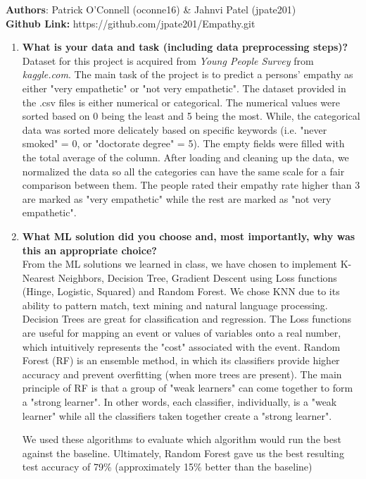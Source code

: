 \documentclass[5px]{report}
\begin{document}
\setlength\parindent{0pt}\textbf{Authors}: Patrick O'Connell (oconne16) \& Jahnvi Patel (jpate201) \\
\textbf{Github Link:} https://github.com/jpate201/Empathy.git
\begin{enumerate}
\item \textbf{What is your data and task (including data preprocessing steps)?} \\
Dataset for this project is acquired from \textit{Young People Survey} from \textit{kaggle.com}. The main task of the project is to predict a persons' empathy as either "very empathetic" or "not very empathetic". The dataset provided in the .csv files is either numerical or categorical. The numerical values were sorted based on 0 being the least and 5 being the most. While, the categorical data was sorted more delicately based on specific keywords (i.e. "never smoked" = 0, or "doctorate degree" = 5). The empty fields were filled with the total average of the column. After loading and cleaning up the data, we normalized the data so all the categories can have the same scale for a fair comparison between them. The people rated their empathy rate higher than 3 are marked as "very empathetic" while the rest are marked as "not very empathetic".

\item \textbf{What ML solution did you choose and, most importantly, why was this an appropriate choice?}\\
From the ML solutions we learned in class, we have chosen to implement K-Nearest Neighbors, Decision Tree, Gradient Descent using Loss functions (Hinge, Logistic, Squared) and Random Forest. We chose KNN due to its ability to pattern match, text mining and natural language processing. Decision Trees are great for classification and regression. The Loss functions are useful for mapping an event or values of variables onto a real number, which intuitively represents the "cost" associated with the event. Random Forest (RF) is an ensemble method, in which its classifiers provide higher accuracy and prevent overfitting (when more trees are present). The main principle of RF is that a group of "weak learners" can come together to form a "strong learner". In other words, each classifier, individually, is a "weak learner" while all the classifiers taken together create a "strong learner".

We used these algorithms to evaluate which algorithm would run the best against the baseline. Ultimately, Random Forest gave us the best resulting test accuracy of 79\% (approximately 15\% better than the baseline)


\end{enumerate}
\end{document}
